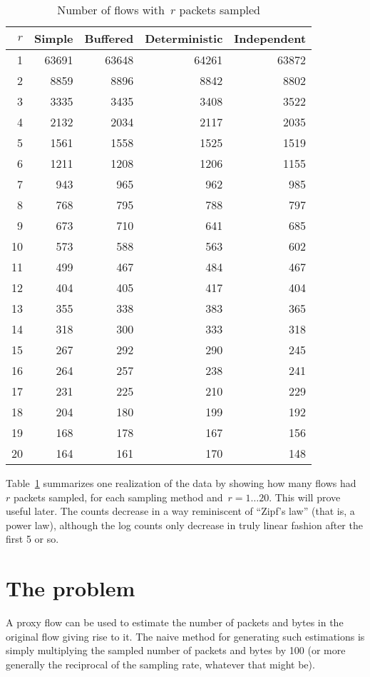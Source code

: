 \documentclass{paper}
\begin{document}
\begin{table}
\begin{center}
\begin{tabular}{r r r r r}
$r$ & Simple & Buffered & Deterministic & Independent \\
\midrule
1 & 63691 & 63648 & 64261 & 63872 \\
2 & 8859 & 8896 & 8842 & 8802 \\
3 & 3335 & 3435 & 3408 & 3522 \\
4 & 2132 & 2034 & 2117 & 2035 \\
5 & 1561 & 1558 & 1525 & 1519 \\
6 & 1211 & 1208 & 1206 & 1155 \\
7 & 943 & 965 & 962 & 985 \\
8 & 768 & 795 & 788 & 797 \\
9 & 673 & 710 & 641 & 685 \\
10 & 573 & 588 & 563 & 602 \\
11 & 499 & 467 & 484 & 467 \\
12 & 404 & 405 & 417 & 404 \\
13 & 355 & 338 & 383 & 365 \\
14 & 318 & 300 & 333 & 318 \\
15 & 267 & 292 & 290 & 245 \\
16 & 264 & 257 & 238 & 241 \\
17 & 231 & 225 & 210 & 229 \\
18 & 204 & 180 & 199 & 192 \\
19 & 168 & 178 & 167 & 156 \\
20 & 164 & 161 & 170 & 148 \\
\end{tabular}
\caption{Number of flows with~$r$ packets sampled}
\label{flows_with_r}
\end{center}
\end{table}

Table~\ref{flows_with_r} summarizes one realization of the data by showing how
many flows had~$r$ packets sampled, for each sampling method and~$r = 1 \dots
20$. This will prove useful later. The counts decrease in a way reminiscent of
``Zipf's law'' (that is, a power law), although the log counts only decrease in
truly linear fashion after the first 5 or so.

\section{The problem}

A proxy flow can be used to estimate the number of packets and bytes in the
original flow giving rise to it. The naive method for generating such
estimations is simply multiplying the sampled number of packets and bytes by 100
(or more generally the reciprocal of the sampling rate, whatever that might be).
\end{document}
